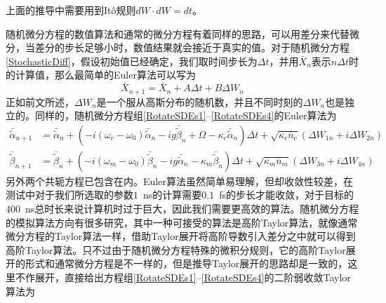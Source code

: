 上面的推导中需要用到It\^o规则$dW \cdot dW=dt$。

随机微分方程的数值算法和通常的微分方程有着同样的思路，可以用差分来代替微分，当差分的步长足够小时，数值结果就会接近于真实的值。对于随机微分方程\eqref{StochasticDiff}，假设初始值已经确定，我们取时间步长为$\Delta t$，并用$\bar{X}_n$表示$n\Delta t$时的计算值，那么最简单的Euler算法可以写为
\begin{equation}
\bar{X}_{n+1}=\bar{X}_n + A \Delta t + B \Delta W_n
\end{equation}
正如前文所述，$\Delta W_n$是一个服从高斯分布的随机数，并且不同时刻的$\Delta W_n$也是独立的。同样的，随机微分方程组\eqref{RotateSDEs1}--\eqref{RotateSDEs4}的Euler算法为
\begin{equation}
\begin{aligned}
\bar{\tilde{\alpha}}_{n+1}&=\bar{\tilde{\alpha}}_{n}+(-i(\omega_{c}-\omega_{0})\bar{\tilde{\alpha}}_{n}-ig\bar{\tilde{\beta}}_{n}+\Omega -\kappa_{c}\bar{\tilde{\alpha}}_{n})\Delta t+\sqrt{\kappa_c\overline{n}_{c}}(\Delta{W}_{1n}+i\Delta{W}_{2n}) \\
\bar{\tilde{\beta}}_{n+1}&=\bar{\tilde{\beta}}_{n}+(-i(\omega_{m}-\omega_{0})\bar{\tilde{\beta}}_{n}-ig\bar{\tilde{\alpha}}_{n}-\kappa_{m}\bar{\tilde{\beta}}_{n})\Delta t+\sqrt{\kappa_m\overline{n}_{m}}(\Delta{W}_{3n}+i\Delta{W}_{4n})
\end{aligned}
\end{equation}
另外两个共轭方程已包含在内。Euler算法虽然简单易理解，但却收敛性较差，在测试中对于我们所选取的参数$1$~ns的计算需要$0.1$~fs的步长才能收敛，对于目标的$400$~ns总时长来说计算机时过于巨大，因此我们需要更高效的算法。随机微分方程的模拟算法方向有很多研究\cite{Kloeden1992numerical}，其中一种可接受的算法是高阶Taylor算法，就像通常微分方程的Taylor算法一样，借助Taylor展开将高阶导数引入差分之中就可以得到高阶Taylor算法。只不过由于随机微分方程特殊的微积分规则，它的高阶Taylor展开的形式和通常微分方程是不一样的，但是推导Taylor展开的思路却是一致的，这里不作展开，直接给出方程组\eqref{RotateSDEs1}--\eqref{RotateSDEs4}的二阶弱收敛Taylor算法为
